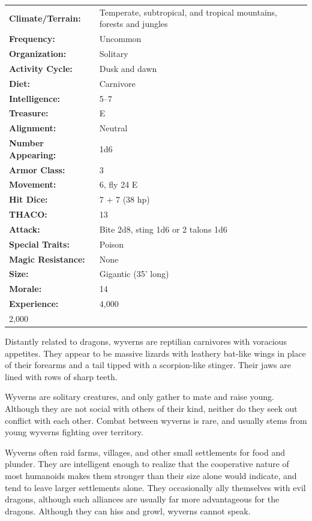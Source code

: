 \begin{multicols}{2}
\begin{minipage}{\columnwidth}
\noindent \begin{tabular}{p{}p{}}
\textbf{Climate/Terrain:}	& Temperate, subtropical, and tropical mountains, forests and jungles	\\
\textbf{Frequency:} 		& Uncommon	\\
\textbf{Organization:} 		& Solitary	\\
\textbf{Activity Cycle:} 	& Dusk and dawn	\\
\textbf{Diet:} 				& Carnivore	\\
\textbf{Intelligence:} 		& 5--7	\\
\textbf{Treasure:} 			& E	\\
\textbf{Alignment:} 		& Neutral	\\
\hline
\textbf{Number Appearing:} 	& 1d6	\\
\textbf{Armor Class:} 		& 3	\\
\textbf{Movement:} 			& 6, fly 24 E	\\
\textbf{Hit Dice:} 			& 7 + 7 (38 hp)	\\
\textbf{THACO:} 			& 13	\\
\textbf{Attack:} 			& Bite 2d8, sting 1d6 or 2 talons 1d6	\\
\textbf{Special Traits:} & Poison	\\
\textbf{Magic Resistance:} 	& None	\\
\textbf{Size:} 				& Gigantic (35' long)	\\
\textbf{Morale:} 			& 14	\\
\textbf{Experience:} 		& 4,000	\\ 2,000
\end{tabular}

\end{minipage}

Distantly related to dragons, wyverns are reptilian carnivores with voracious appetites. They appear to be massive lizards with leathery bat-like wings in place of their forearms and a tail tipped with a scorpion-like stinger. Their jaws are lined with rows of sharp teeth.

Wyverns are solitary creatures, and only gather to mate and raise young. Although they are not social with others of their kind, neither do they seek out conflict with each other. Combat between wyverns is rare, and usually stems from young wyverns fighting over territory.

Wyverns often raid farms, villages, and other small settlements for food and plunder. They are intelligent enough to realize that the cooperative nature of most humanoids makes them stronger than their size alone would indicate, and tend to leave larger settlements alone. They occasionally ally themselves with evil dragons, although such alliances are usually far more advantageous for the dragons. Although they can hiss and growl, wyverns cannot speak.


\end{multicols}
